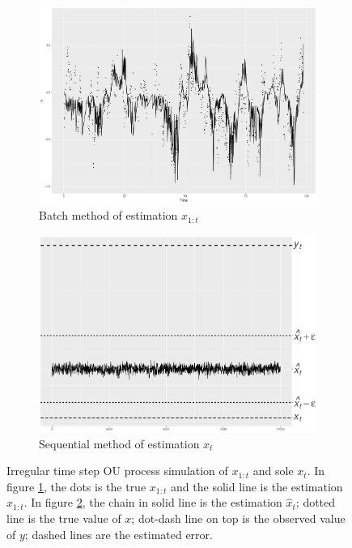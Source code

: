 \begin{figure}[h]
\centering
\begin{subfigure}[h]{0.45\textwidth}
    \includegraphics[width=\textwidth]{Chapters/05MCMCOU/plots/simudataOUallX.pdf}
     \caption{Batch method of estimation $x_{1:t}$}\label{MCMCOUallX}
\end{subfigure}
\begin{subfigure}[h]{0.45\textwidth}
    \includegraphics[width=\textwidth]{Chapters/05MCMCOU/plots/simudataOUXt2.pdf}
     \caption{Sequential method of estimation $x_t$}\label{MCMCOUallXt2}
\end{subfigure}
\caption{Irregular time step OU process simulation of $x_{1:t}$ and sole $x_t$. In figure \ref{MCMCOUallX}, the dots is the true $x_{1:t}$ and the solid line is the estimation $\hat{x}_{1:t}$. In figure \ref{MCMCOUallXt2}, the chain in solid line is the estimation $\hat{x}_t$; dotted line is the true value of $x$; dot-dash line on top is the observed value of $y$; dashed lines are the estimated error. }
\label{simuOUxt}
\end{figure}




